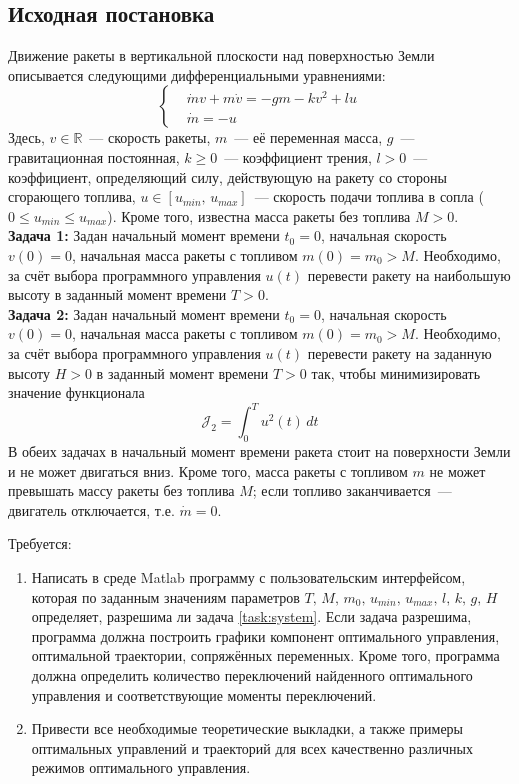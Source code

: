 \documentclass[11pt, oneside, final]{article}
\theoremstyle{break}
\numberwithin{equation}{section}
\theoremstyle{plain}
\theoremstyle{definition}
\begin{document}
    \subsection{Исходная постановка}
    \label{sub:given}
    Движение ракеты в вертикальной плоскости над поверхностью Земли описывается следующими дифференциальными уравнениями: 
    \begin{equation}
        \label{task:system}
        \left\{
        \begin{aligned}
            &\dot mv + m \dot v = -gm - kv^2 + lu \\
            &\dot m = -u 
        \end{aligned}
        \right.
    \end{equation}
    Здесь, \(v \in \mathbb{R} \)~--- скорость ракеты, \(m\)~--- её переменная масса, \(g\)~--- гравитационная постоянная, \(k \geqslant 0\)~--- коэффициент трения, \(l > 0\)~--- коэффициент, определяющий силу, действующую на ракету со стороны сгорающего топлива, \(u \in \left[u_{min},\,u_{max}\right]\)~--- скорость подачи топлива в сопла (\(0 \leqslant u_{min} \leqslant u_{max}\)). Кроме того, известна масса ракеты без топлива \(M > 0\). \\
    \textbf{Задача 1:} Задан начальный момент времени \(t_0 = 0\), начальная скорость \(v(0) = 0\), начальная масса ракеты с топливом \(m(0) = m_0 > M\). Необходимо, за счёт выбора программного управления \(u(t)\) перевести ракету на наибольшую высоту в заданный момент времени \(T > 0\).\\
    \textbf{Задача 2:} Задан начальный момент времени \(t_0 = 0\), начальная скорость \(v(0) = 0\), начальная масса ракеты с топливом \(m(0) = m_0 > M\). Необходимо, за счёт выбора программного управления \(u(t)\) перевести ракету на заданную высоту \(H > 0\) в заданный момент времени \(T > 0\) так, чтобы минимизировать значение функционала 
    \begin{equation*}
        \mathcal{J}_2 = \int_0^T{u^2(t)\,dt}
    \end{equation*}
    В обеих задачах в начальный момент времени ракета стоит на поверхности Земли и не может двигаться вниз. Кроме того, масса ракеты с топливом \(m\) не может превышать массу ракеты без топлива \(M\); если топливо заканчивается~--- двигатель отключается, т.е. \(\dot m = 0\). 
    
    Требуется: 
    \begin{enumerate} 
        \item Написать в среде Matlab программу с пользовательским интерфейсом, которая по заданным значениям параметров \(T,\,M,\,m_0,\,u_{min},\,u_{max},\,l,\,k,\,g,\,H\) определяет, разрешима ли задача \eqref{task:system}. Если задача разрешима, программа должна построить графики компонент оптимального управления, оптимальной траектории, сопряжённых переменных. Кроме того, программа должна определить количество переключений найденного оптимального управления и соответствующие моменты переключений.
        \item Привести все необходимые теоретические выкладки, а также примеры оптимальных управлений и траекторий для всех качественно различных режимов оптимального управления.
    \end{enumerate}
    \pagebreak
\end{document}
